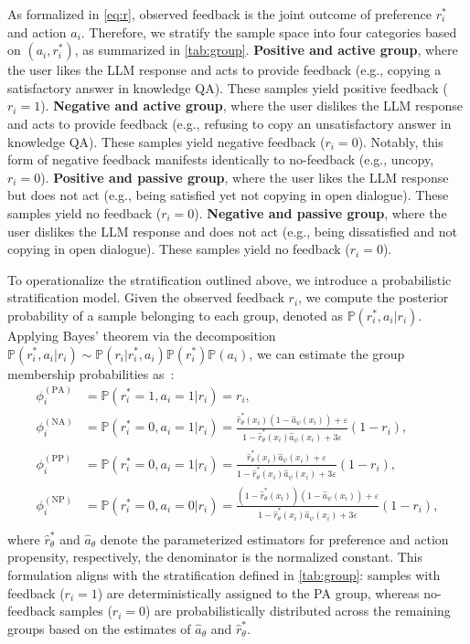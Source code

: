 \documentclass[]{arxiv_singlecolumn}
\theoremstyle{plain}
\theoremstyle{definition}
\theoremstyle{remark}
\begin{document}
As formalized in \eqref{eq:r}, observed feedback is the joint outcome of preference $r^*_i$ and action $a_i$. Therefore, we stratify the sample space into four categories based on $(a_i, r^*_i)$, as summarized in \autoref{tab:group}.
  \textbf{Positive and active group}, where the user likes the LLM response and acts to provide feedback (e.g., copying a satisfactory answer in knowledge QA). These samples yield positive feedback ($r_i=1$).
  \textbf{Negative and active group}, where the user dislikes the LLM response and acts to provide feedback  (e.g., refusing to copy an unsatisfactory answer in knowledge QA). These samples yield negative feedback ($r_i=0$). Notably, this form of negative feedback manifests identically to no-feedback (e.g., uncopy, $r_i=0$).
     \textbf{Positive and passive group}, where the user likes the LLM response but does not act (e.g., being satisfied yet not copying in open dialogue). These samples yield no feedback ($r_i=0$).
     \textbf{Negative and passive group}, where the user dislikes the LLM response and does not act (e.g., being dissatisfied and not copying in open dialogue).  These samples yield no feedback ($r_i=0$).


To operationalize the stratification outlined above, we introduce a probabilistic stratification model. Given the observed feedback $r_i$, we compute the posterior probability of a sample belonging to each group, denoted as $\mathbb{P}(r^*_i, a_i|r_i)$. Applying Bayes' theorem via the decomposition $\mathbb{P}(r^*_i, a_i|r_i)\sim\mathbb{P}(r_i|r^*_i, a_i)\mathbb{P}(r^*_i)\mathbb{P}(a_i)$, we can estimate the group membership probabilities as~\citep{Recrec}:
\begin{equation}\label{eq:stratification}
    \begin{aligned}
        \phi^\mathrm{(PA)}_i&=\mathbb{P}(r^*_i=1, a_i=1|r_i)=r_i,\\
        \phi^\mathrm{(NA)}_i&=\mathbb{P}(r^*_i=0, a_i=1|r_i)=\frac{\hat{r}^*_\theta(x_i)(1-\hat{a}_\psi(x_i))+\varepsilon}{1-\hat{r}^*_\theta(x_i)\hat{a}_\psi(x_i)+3\varepsilon}(1-r_i),\\
        \phi^\mathrm{(PP)}_i&=\mathbb{P}(r^*_i=0, a_i=1|r_i)=\frac{\hat{r}^*_\theta(x_i) \hat{a}_\psi(x_i)+\varepsilon}{1-\hat{r}^*_\theta(x_i)\hat{a}_\psi(x_i)+3\varepsilon}(1-r_i),\\
        \phi^\mathrm{(NP)}_i&=\mathbb{P}(r^*_i=0, a_i=0|r_i)=\frac{(1-\hat{r}^*_\theta(x_i))(1-\hat{a}_\psi(x_i))+\varepsilon}{1-\hat{r}^*_\theta(x_i)\hat{a}_\psi(x_i)+3\varepsilon}(1-r_i),\\
    \end{aligned}
\end{equation}
where $\hat{r}^*_\theta$ and $\hat{a}_{\theta}$ denote the parameterized estimators for preference and action propensity, respectively, the denominator is the normalized constant. This formulation aligns with the stratification defined in \autoref{tab:group}: samples with feedback ($r_i=1$) are deterministically assigned to the PA group, whereas no-feedback samples ($r_i=0$) are probabilistically distributed across the remaining groups based on the estimates of $\hat{a}_{\theta}$ and $\hat{r}^*_\theta$.
\end{document}
